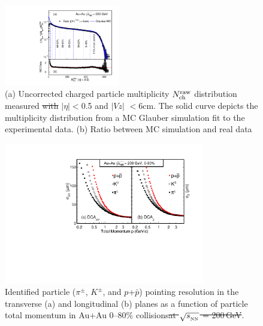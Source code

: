 \documentclass[%
 reprint,	
 amsmath,amssymb,
 aps,
 prc,
]{revtex4-1}
\providecommand{\DIFaddtex}[1]{{\protect\color{blue}\uwave{#1}}} %
\providecommand{\DIFdeltex}[1]{{\protect\color{red}\sout{#1}}}                      %
\providecommand{\DIFaddFL}[1]{\DIFadd{#1}} %
\providecommand{\DIFdelFL}[1]{\DIFdel{#1}} %
\providecommand{\DIFaddbeginFL}{} %
\providecommand{\DIFaddendFL}{} %
\providecommand{\DIFdelbeginFL}{} %
\providecommand{\DIFdelendFL}{} %
\providecommand{\DIFadd}[1]{\texorpdfstring{\DIFaddtex{#1}}{#1}} %
\providecommand{\DIFdel}[1]{\texorpdfstring{\DIFdeltex{#1}}{}} %
\begin{document}
\begin{figure}[h]
\centering
\includegraphics[width=0.45\textwidth]{fig/centrality.pdf}
  \caption{(a) Uncorrected charged particle multiplicity $N_{\rm ch}^{\rm raw}$ distribution measured \DIFdelbeginFL \DIFdelFL{with }\DIFdelendFL \DIFaddbeginFL \DIFaddFL{within }\DIFaddendFL $|\eta|$\DIFaddbeginFL \DIFaddFL{\,}\DIFaddendFL $<$\DIFaddbeginFL \DIFaddFL{\,}\DIFaddendFL 0.5 and \DIFdelbeginFL \DIFdelFL{$|Vz|$ }\DIFdelendFL \DIFaddbeginFL \DIFaddFL{$|V_z^{\rm{TPC}}|$\,}\DIFaddendFL $<$\DIFaddbeginFL \DIFaddFL{\,}\DIFaddendFL 6\DIFaddbeginFL \DIFaddFL{\,}\DIFaddendFL cm. The solid curve depicts the multiplicity distribution from a MC Glauber simulation fit to the experimental data. (b) Ratio between MC simulation and real data\DIFaddbeginFL \DIFaddFL{.}\DIFaddendFL }
\label{fig:centrality} 
\end{figure}


\begin{figure}
\centering
\DIFdelbeginFL %
\DIFdelendFL \DIFaddbeginFL \includegraphics[width=0.78\textwidth]{fig/DCAXy_Z.pdf}
\DIFaddendFL \caption{Identified particle ($\pi^{\pm}$, $K^{\pm}$, and $p$+$\bar{p}$) pointing resolution in the transverse (a) and longitudinal (b) planes as a function of particle total momentum in Au+Au 0--80\% collisions\DIFdelbeginFL \DIFdelFL{at $\sqrt{s_{_{\rm NN}}}$ = 200\,GeV}\DIFdelendFL .}
\label{fig:DCAXy_Z} 
\end{figure}
\end{document}
